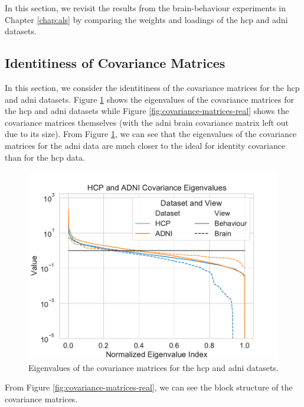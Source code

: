 In this section, we revisit the results from the brain-behaviour experiments in Chapter \ref{chap:als} by comparing the weights and \gls{loadings} of the \acrshort{hcp} and \acrshort{adni} datasets.

\subsection{Identitiness of Covariance Matrices}
In this section, we consider the identitiness of the covariance matrices for the \acrshort{hcp} and \acrshort{adni} datasets.
Figure \ref{fig:covariance-eigenvalues-real} shows the eigenvalues of the covariance matrices for the \acrshort{hcp} and \acrshort{adni} datasets while Figure \ref{fig:covariance-matrices-real} shows the covariance matrices themselves (with the \acrshort{adni} brain covariance matrix left out due to its size).
From Figure \ref{fig:covariance-eigenvalues-real}, we can see that the eigenvalues of the covariance matrices for the \acrshort{adni} data are much closer to the ideal for identity covariance than for the \acrshort{hcp} data.
\begin{figure}
    \centering
    \includegraphics[width=0.8\linewidth]{figures/covariance/hcp_adni_covariance_eigenvalues}
    \caption{Eigenvalues of the covariance matrices for the \acrshort{hcp} and \acrshort{adni} datasets.}\label{fig:covariance-eigenvalues-real}
\end{figure}

From Figure \ref{fig:covariance-matrices-real}, we can see the block structure of the covariance matrices.

